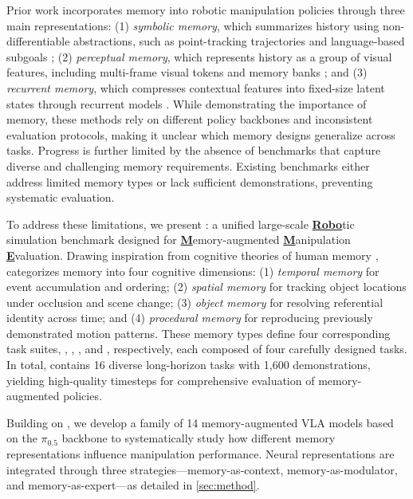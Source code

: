 Prior work incorporates memory into robotic manipulation policies through three main representations:
(1) \textit{symbolic memory}, which summarizes history using non-differentiable abstractions, such as point-tracking trajectories \cite{chen2025history} and language-based subgoals \cite{sridhar2025memer};
(2) \textit{perceptual memory}, which represents history as a group of visual features, including  multi-frame visual tokens \cite{jang2025contextvla} and memory banks \cite{fang2025sam2act, shi2025memoryvla};
and (3) \textit{recurrent memory}, which compresses contextual features into fixed-size latent states through recurrent models \cite{zhou2025mtil, liu2024robomamba}.
While demonstrating the importance of memory, these methods rely on different policy backbones and inconsistent evaluation protocols, making it unclear which memory designs generalize across tasks.
Progress is further limited by the absence of benchmarks that capture diverse and challenging memory requirements.
Existing benchmarks either address limited memory types or lack sufficient demonstrations, preventing systematic evaluation.

To address these limitations, we present \textbf{\benchname}: a unified large-scale \underline{\textbf{Robo}}tic simulation benchmark designed for \underline{\textbf{M}}emory-augmented \underline{\textbf{M}}anipulation \underline{\textbf{E}}valuation.
Drawing inspiration from cognitive theories of human memory \cite{atkinson1968human}, \benchname\xspace categorizes memory into four cognitive dimensions: (1) \textit{temporal memory} for event accumulation and ordering; (2) \textit{spatial memory} for tracking object locations under occlusion and scene change; (3) \textit{object memory} for resolving referential identity across time; and (4) \textit{procedural memory} for reproducing previously demonstrated motion patterns. These memory types define four corresponding task suites, \TSone, \TStwo, \TSthree, and \TSfour, respectively, each composed of four carefully designed tasks. In total, \benchname\xspace contains 16 diverse long-horizon tasks with 1,600 demonstrations, yielding \trainsteps\xspace high-quality timesteps for comprehensive evaluation of memory-augmented policies.

Building on \benchname, we develop a family of 14 memory-augmented VLA models based on the $\pi_{0.5}$ backbone \cite{pi05} to systematically study how different memory representations influence manipulation performance.
Neural representations are integrated through three strategies---memory-as-context, memory-as-modulator, and memory-as-expert---as detailed in \cref{sec:method}.

